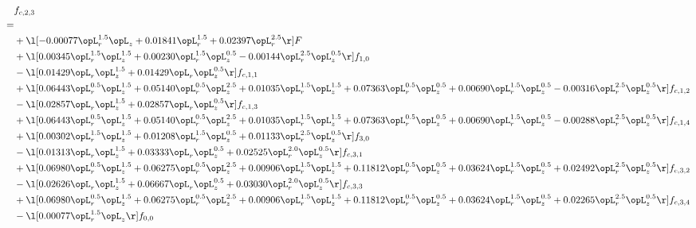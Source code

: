 \begin{alignat}{2} 
\label{eq:f_23_1} 
& f_{c,2,3} \nonumber \\ 
 = \\ 
& + \l[  -0.00077 \opL_r^{1.5} \opL_z +  0.01841 \opL_r^{1.5} +  0.02397 \opL_r^{2.5}  \r] F \nonumber \\ 
& + \l[  0.00345 \opL_r^{1.5} \opL_z^{1.5} +  0.00230 \opL_r^{1.5} \opL_z^{0.5}   -0.00144 \opL_r^{2.5} \opL_z^{0.5}  \r] f_{1,0} \nonumber \\ 
& - \l[  0.01429 \opL_r \opL_z^{1.5} +  0.01429 \opL_r \opL_z^{0.5}  \r] f_{c,1,1} \nonumber \\ 
& + \l[  0.06443 \opL_r^{0.5} \opL_z^{1.5} +  0.05140 \opL_r^{0.5} \opL_z^{2.5} +  0.01035 \opL_r^{1.5} \opL_z^{1.5} +  0.07363 \opL_r^{0.5} \opL_z^{0.5} +  0.00690 \opL_r^{1.5} \opL_z^{0.5}   -0.00316 \opL_r^{2.5} \opL_z^{0.5}  \r] f_{c,1,2} \nonumber \\ 
& - \l[  0.02857 \opL_r \opL_z^{1.5} +  0.02857 \opL_r \opL_z^{0.5}  \r] f_{c,1,3} \nonumber \\ 
& + \l[  0.06443 \opL_r^{0.5} \opL_z^{1.5} +  0.05140 \opL_r^{0.5} \opL_z^{2.5} +  0.01035 \opL_r^{1.5} \opL_z^{1.5} +  0.07363 \opL_r^{0.5} \opL_z^{0.5} +  0.00690 \opL_r^{1.5} \opL_z^{0.5}   -0.00288 \opL_r^{2.5} \opL_z^{0.5}  \r] f_{c,1,4} \nonumber \\ 
& + \l[  0.00302 \opL_r^{1.5} \opL_z^{1.5} +  0.01208 \opL_r^{1.5} \opL_z^{0.5} +  0.01133 \opL_r^{2.5} \opL_z^{0.5}  \r] f_{3,0} \nonumber \\ 
& - \l[  0.01313 \opL_r \opL_z^{1.5} +  0.03333 \opL_r \opL_z^{0.5} +  0.02525 \opL_r^{2.0} \opL_z^{0.5}  \r] f_{c,3,1} \nonumber \\ 
& + \l[  0.06980 \opL_r^{0.5} \opL_z^{1.5} +  0.06275 \opL_r^{0.5} \opL_z^{2.5} +  0.00906 \opL_r^{1.5} \opL_z^{1.5} +  0.11812 \opL_r^{0.5} \opL_z^{0.5} +  0.03624 \opL_r^{1.5} \opL_z^{0.5} +  0.02492 \opL_r^{2.5} \opL_z^{0.5}  \r] f_{c,3,2} \nonumber \\ 
& - \l[  0.02626 \opL_r \opL_z^{1.5} +  0.06667 \opL_r \opL_z^{0.5} +  0.03030 \opL_r^{2.0} \opL_z^{0.5}  \r] f_{c,3,3} \nonumber \\ 
& + \l[  0.06980 \opL_r^{0.5} \opL_z^{1.5} +  0.06275 \opL_r^{0.5} \opL_z^{2.5} +  0.00906 \opL_r^{1.5} \opL_z^{1.5} +  0.11812 \opL_r^{0.5} \opL_z^{0.5} +  0.03624 \opL_r^{1.5} \opL_z^{0.5} +  0.02265 \opL_r^{2.5} \opL_z^{0.5}  \r] f_{c,3,4} \nonumber \\ 
& - \l[  0.00077 \opL_r^{1.5} \opL_z  \r] f_{0,0} \nonumber \\ 

\end{alignat}
